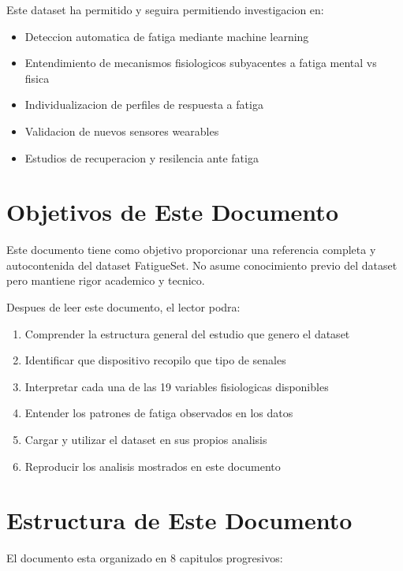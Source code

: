 Este dataset ha permitido y seguira permitiendo investigacion en:
\begin{itemize}
    \item Deteccion automatica de fatiga mediante machine learning
    \item Entendimiento de mecanismos fisiologicos subyacentes a fatiga mental vs fisica
    \item Individualizacion de perfiles de respuesta a fatiga
    \item Validacion de nuevos sensores wearables
    \item Estudios de recuperacion y resilencia ante fatiga
\end{itemize}

\section{Objetivos de Este Documento}

Este documento tiene como objetivo proporcionar una referencia completa y autocontenida
del dataset FatigueSet. No asume conocimiento previo del dataset pero mantiene
rigor academico y tecnico.

Despues de leer este documento, el lector podra:

\begin{enumerate}
    \item Comprender la estructura general del estudio que genero el dataset
    \item Identificar que dispositivo recopilo que tipo de senales
    \item Interpretar cada una de las 19 variables fisiologicas disponibles
    \item Entender los patrones de fatiga observados en los datos
    \item Cargar y utilizar el dataset en sus propios analisis
    \item Reproducir los analisis mostrados en este documento
\end{enumerate}

\section{Estructura de Este Documento}

El documento esta organizado en 8 capitulos progresivos:

